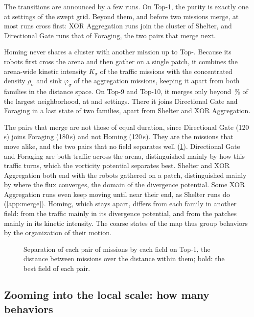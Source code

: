 \documentclass[pdflatex,sn-apa]{sn-jnl}
\begin{document}
The transitions are announced by a few runs. On Top-1, the purity is exactly one at  settings of the
swept grid. Beyond them, and before two missions merge, at most  runs cross first: XOR
Aggregation runs join the cluster of Shelter, and Directional Gate runs that of Foraging, the two pairs that merge
next.

Homing never shares a cluster with another mission up to Top-. Because its robots first cross the
arena and then gather on a single patch, it combines the arena-wide kinetic intensity $K_\sigma$ of the traffic
missions with the concentrated density $\rho_\sigma$ and sink $\varphi_\sigma$ of the aggregation missions, keeping it
apart from both families in the distance space. On Top-9 and Top-10, it merges only beyond
\,\% of the largest neighborhood, at  and  settings. There it
joins Directional Gate and Foraging in a last state of two families, apart from Shelter and XOR Aggregation.

The pairs that merge are not those of equal duration, since Directional Gate (120\,s) joins Foraging (180\,s) and not Homing
(120\,s). They are the missions that move alike, and the two pairs that no field separates well (\cref{fig:pairs}).
Directional Gate and Foraging are both traffic across the arena, distinguished mainly by how this traffic turns, which
the vorticity potential separates best. Shelter and XOR Aggregation both end with the robots gathered on a patch,
distinguished mainly by where the flux converges, the domain of the divergence potential. Some XOR Aggregation runs even
keep moving until near their end, as Shelter runs do (\cref{app:merge}). Homing, which stays apart, differs from each
family in another field: from the traffic mainly in its divergence potential, and from the patches mainly in its
kinetic intensity. The coarse states of the map thus group behaviors by the organization of their motion.

\begin{figure}[!htb]
\centering
{}
\caption{Separation of each pair of missions by each field on Top-1, the distance between missions over the distance
within them; bold: the best field of each pair.}
\label{fig:pairs}
\end{figure}

\subsection{Zooming into the local scale: how many behaviors}
\label{sec:res_control}
\end{document}
